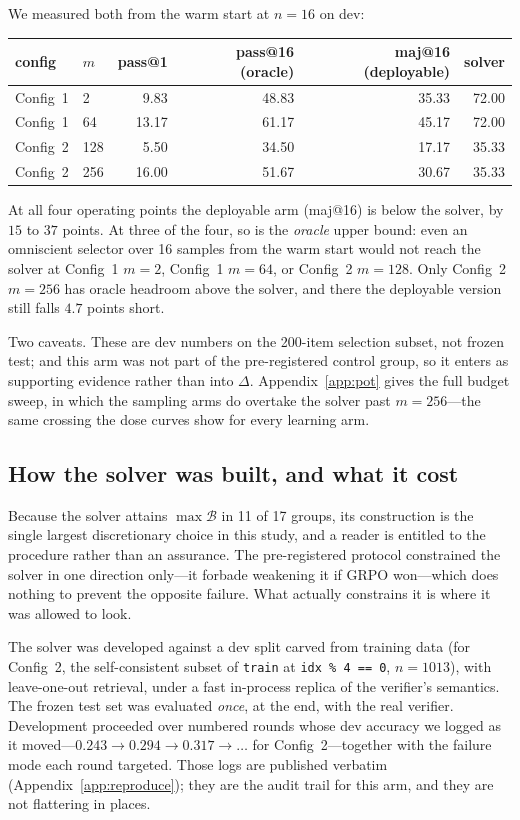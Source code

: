 We measured both from the warm start at $n{=}16$ on dev:

\begin{center}
\begin{tabular}{llrrrr}
\toprule
config & $m$ & pass@1 & pass@16 (oracle) & maj@16 (deployable) & solver \\
\midrule
Config~1 & 2   & 9.83  & 48.83 & 35.33 & 72.00 \\
Config~1 & 64  & 13.17 & 61.17 & 45.17 & 72.00 \\
Config~2 & 128 & 5.50  & 34.50 & 17.17 & 35.33 \\
Config~2 & 256 & 16.00 & 51.67 & 30.67 & 35.33 \\
\bottomrule
\end{tabular}
\end{center}

At all four operating points the deployable arm (maj@16) is below the solver,
by $15$ to $37$ points. At three of the four, so is the \emph{oracle} upper
bound: even an omniscient selector over 16 samples from the warm start would
not reach the solver at Config~1 $m{=}2$, Config~1 $m{=}64$, or Config~2
$m{=}128$. Only Config~2 $m{=}256$ has oracle headroom above the solver, and
there the deployable version still falls $4.7$ points short.

Two caveats. These are dev numbers on the 200-item selection subset, not frozen
test; and this arm was not part of the pre-registered control group, so it
enters as supporting evidence rather than into $\Delta$. Appendix~\ref{app:pot}
gives the full budget sweep, in which the sampling arms do overtake the solver
past $m{=}256$---the same crossing the dose curves show for every learning arm.

\subsection{How the solver was built, and what it cost}
\label{subsec:solvercost}

Because the solver attains $\max\mathcal{B}$ in 11 of 17 groups, its
construction is the single largest discretionary choice in this study, and a
reader is entitled to the procedure rather than an assurance. The pre-registered
protocol constrained the solver in one direction only---it forbade weakening it
if GRPO won---which does nothing to prevent the opposite failure. What actually
constrains it is where it was allowed to look.

The solver was developed against a dev split carved from training data (for
Config~2, the self-consistent subset of \texttt{train} at \texttt{idx \% 4 == 0},
$n{=}1013$), with leave-one-out retrieval, under a fast in-process replica of
the verifier's semantics. The frozen test set was evaluated \emph{once}, at the
end, with the real verifier. Development proceeded over numbered rounds whose
dev accuracy we logged as it moved---$0.243 \rightarrow 0.294 \rightarrow 0.317
\rightarrow \ldots$ for Config~2---together with the failure mode each round
targeted. Those logs are published verbatim
(Appendix~\ref{app:reproduce}); they are the audit trail for this arm, and they
are not flattering in places.

